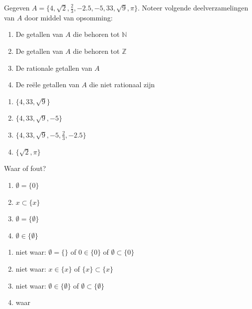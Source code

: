 \begin{oef}
Gegeven $A=\{4,\sqrt{2}, \frac{2}{3}, -2.5, -5,33,\sqrt{9},\pi \}$. Noteer volgende deelverzamelingen van $A$ door middel van opsomming:
\begin{enumerate}
\item De  getallen van $A$ die behoren tot $\mathbb{N}$
\item De  getallen van $A$ die behoren tot $\mathbb{Z}$
\item De rationale getallen van $A$
\item De re\"ele getallen van $A$ die niet rationaal zijn
\end{enumerate}
\begin{opl}
\begin{enumerate}
\item $\{ 4,33,\sqrt{9}\}$
\item $\{ 4,33,\sqrt{9},-5\}$
\item $\{ 4,33,\sqrt{9},-5,\frac 23,-2.5\}$
\item $\{\sqrt{2},\pi\}$
\end{enumerate}
\end{opl}
\end{oef}



\begin{oef}
Waar of fout?
\begin{enumerate}
\item $\emptyset=\{0\}$
\item $x\subset \{x\}$
\item $\emptyset=\{\emptyset\}$
\item $\emptyset\in \{\emptyset\}$
\end{enumerate}
\begin{opl}
\begin{enumerate}
\item niet waar: $\emptyset=\{ \}$ of  $0\in \{0\}$ of $\emptyset\subset\{0\}$
\item niet waar: $x\in \{x\}$ of $\{x\}\subset \{x\}$
\item niet waar: $\emptyset\in\{\emptyset\}$ of $\emptyset\subset\{\emptyset\}$
\item waar
\end{enumerate}
\end{opl}
\end{oef}



